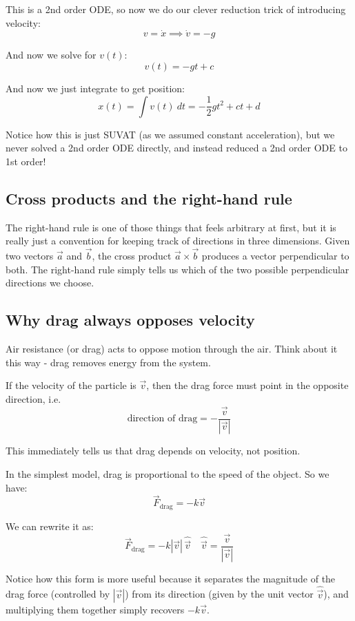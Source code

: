 This is a 2nd order ODE, so now we do our clever reduction trick of introducing velocity: 
$$
v = \dot{x} \implies \dot{v} = -g
$$

And now we solve for $v(t)$: 
$$
v(t) = -gt + c
$$

And now we just integrate to get position: 
$$
x(t) = \int v(t) \ dt = -\frac{1}{2} g t^2 + ct + d
$$

Notice how this is just SUVAT (as we assumed constant acceleration), but we never solved a 2nd order ODE directly, and instead reduced a 2nd order ODE to 1st order! 

\subsection{Cross products and the right-hand rule}

The right-hand rule is one of those things that feels arbitrary at first, but it is really just a convention for keeping track of directions in three dimensions. Given two vectors $\vec{a}$ and $\vec{b}$, the cross product $\vec{a}\times\vec{b}$ produces a vector perpendicular to both. The right-hand rule simply tells us which of the two possible perpendicular directions we choose.


\subsection{Why drag always opposes velocity}

Air resistance (or drag) acts to oppose motion through the air. Think about it this way - drag removes energy from the system. 

If the velocity of the particle is $\vec{v}$, then the drag force must point in the opposite direction, i.e.
$$
\text{direction of drag} = -\frac{\vec{v}}{|\vec{v}|}
$$

This immediately tells us that drag depends on velocity, not position.

In the simplest model, drag is proportional to the speed of the object. So we have: 
$$
\vec{F}_{\text{drag}} = -k\vec{v}
$$

We can rewrite it as: 
$$
\vec{F}_{\text{drag}} = -k|\vec{v}|\,\hat{\vec{v}}
\quad
\hat{\vec{v}} = \frac{\vec{v}}{|\vec{v}|}
$$

Notice how this form is more useful because it separates the magnitude of the drag force (controlled by $|\vec{v}|$) from its direction (given by the unit vector $\hat{\vec{v}}$), and multiplying them together simply recovers $-k\vec{v}$.

